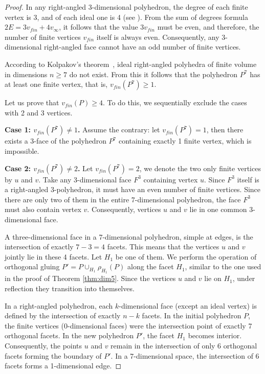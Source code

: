 \documentclass[12pt]{amsart}
\theoremstyle{definition}
\begin{document}
	\begin{proof}
		In any right-angled 3-dimensional polyhedron, the degree of each finite vertex is 3, and of each ideal one is 4 (see \cite{Dufour2010}). From the sum of degrees formula $2E = 3v_{fin} + 4v_\infty$, it follows that the value $3v_{fin}$ must be even, and therefore, the number of finite vertices $v_{fin}$ itself is always even. Consequently, any 3-dimensional right-angled face cannot have an odd number of finite vertices.
		
		According to Kolpakov's theorem~\cite{Ko2012}, ideal right-angled polyhedra of finite volume in dimensions $n \geq 7$ do not exist. From this it follows that the polyhedron $P^7$ has at least one finite vertex, that is, $v_{fin}(P^7) \ge 1$.
		
		Let us prove that $v_{fin}(P) \ge 4$. To do this, we sequentially exclude the cases with 2 and 3 vertices.
		
		\textbf{Case 1: $v_{fin}(P^7) \ne 1$.} 
		Assume the contrary: let $v_{fin}(P^7) = 1$, then there exists a 3-face of the polyhedron $P^7$ containing exactly 1 finite vertex, which is impossible.
		
		\textbf{Case 2: $v_{fin}(P^7) \ne 2$.} 
		Let $v_{fin}(P^7) = 2$, we denote the two only finite vertices by $u$ and $v$. Take any 3-dimensional face $F^3$ containing vertex $u$. Since $F^3$ itself is a right-angled 3-polyhedron, it must have an even number of finite vertices. Since there are only two of them in the entire 7-dimensional polyhedron, the face $F^3$ must also contain vertex $v$. Consequently, vertices $u$ and $v$ lie in one common 3-dimensional face.
		
		A three-dimensional face in a 7-dimensional polyhedron, simple at edges, is the intersection of exactly $7-3=4$ facets. This means that the vertices $u$ and $v$ jointly lie in these 4 facets. Let $H_1$ be one of them. We perform the operation of orthogonal gluing $P' = P \cup_{H_1} \rho_{H_1}(P)$ along the facet $H_1$, similar to the one used in the proof of Theorem \ref{thm:dim5}. Since the vertices $u$ and $v$ lie on $H_1$, under reflection they transition into themselves.
		
		In a right-angled polyhedron, each $k$-dimensional face (except an ideal vertex) is defined by the intersection of exactly $n-k$ facets. In the initial polyhedron $P$, the finite vertices (0-dimensional faces) were the intersection point of exactly 7 orthogonal facets. In the new polyhedron $P'$, the facet $H_1$ becomes interior. Consequently, the points $u$ and $v$ remain in the intersection of only 6 orthogonal facets forming the boundary of $P'$. In a 7-dimensional space, the intersection of 6 facets forms a 1-dimensional edge.
		

\end{proof}
\end{document}
